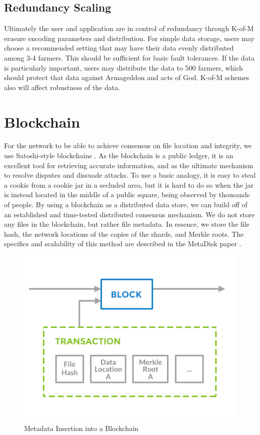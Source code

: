 \documentclass[a4paper,10pt]{article}
\begin{document}
\subsection{Redundancy Scaling}
Ultimately the user and application are in control of redundancy through K-of-M erasure encoding parameters and distribution. For simple data storage, users may choose a recommended setting that may have their data evenly distributed among 3-4 farmers. This should be sufficient for basic fault tolerances. If the data is particularly important, users may distribute the data to 500 farmers, which should protect that data against Armageddon and acts of God. K-of-M schemes also will affect robustness of the data. 

\section{Blockchain}
For the network to be able to achieve consensus on file location and integrity, we use Satoshi-style blockchains \cite{3}. As the blockchain is a public ledger, it is an excellent tool for retrieving accurate information, and as the ultimate mechanism to resolve disputes and dissuade attacks. To use a basic analogy, it is easy to steal a cookie from a cookie jar in a secluded area, but it is hard to do so when the jar is instead located in the middle of a public square, being observed by thousands of people. By using a blockchain as a distributed data store, we can build off of an established and time-tested distributed consensus mechanism. We do not store any files in the blockchain, but rather file metadata. In essence, we store the file hash, the network locations of the copies of the shards, and Merkle roots. The specifics and scalability of this method are described in the MetaDisk paper \cite{1}. \\

\begin{figure}[hbt]
\centering
\includegraphics[width=\linewidth]{6}
\caption{Metadata Insertion into a Blockchain}
\end{figure}
\end{document}
